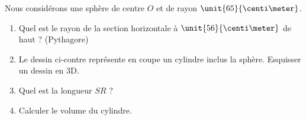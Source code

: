
\begin{exercice}\label{exosmath-0094}

    Nous considérons une sphère de centre \( O\) et de rayon \( \unit{65}{\centi\meter}\).
    \begin{multicols}{2}
        \begin{enumerate}
            \item
                Quel est le rayon de la section horizontale à \( \unit{56}{\centi\meter}\) de haut ? (Pythagore)
            \item
                Le dessin ci-contre représente en coupe un cylindre inclus la sphère. Esquisser un dessin en 3D.
            \item
                Quel est la longueur \( SR\) ?
            \item
                Calculer le volume du cylindre.
        \end{enumerate}

        \columnbreak



    \end{multicols}

\end{exercice}
